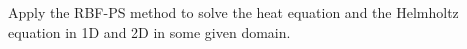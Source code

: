 Apply the RBF-PS method to solve the heat equation and the Helmholtz equation in 1D and 2D in some given
domain.